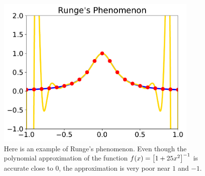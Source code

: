 \begin{figure}[t]
\centering
    \includegraphics[width=10cm]{plots/lagrange/lagrange_runge.pdf}
    \caption[Plot of Runge's Phenomenon]{Here
        is an example of Runge's phenomenon.
        Even though the polynomial approximation of the \gls{function}
        $f(x) = \left[ 1+25x^{2} \right]^{-1}$
        is accurate close to $0$, the approximation is very poor
        near $1$ and $-1$.}
    \label{fig:math_lagrange_runge}
\end{figure}
